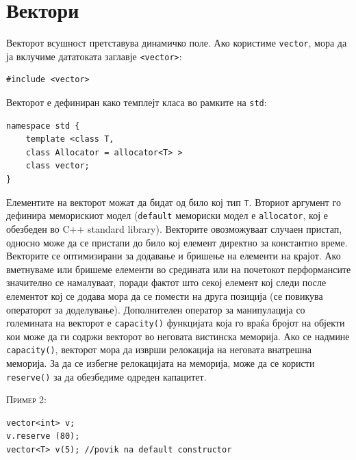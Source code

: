 \section{Вектори}
Векторот всушност претставува динамичко поле. Ако користиме \texttt{vector},
мора да ја вклучиме дататоката заглавје \texttt{<vector>}:
\begin{verbatim}
#include <vector>
\end{verbatim}
Векторот е дефиниран како темплејт класа во рамките на \texttt{std}:

\begin{lstlisting}
namespace std {
	template <class T,
	class Allocator = allocator<T> >
	class vector;
}
\end{lstlisting}

Елементите на векторот можат да бидат од било кој тип \texttt{T}. Вториот
аргумент го дефинира меморискиот модел (\texttt{default} мемориски модел е
\texttt{allocator}, кој е обезбеден во C++ standard library). Векторите
овозможуваат случаен пристап, односно може да се пристапи до било кој елемент
директно за константно време. Векторите се оптимизирани за додавање и бришење на
елементи на крајот. Ако вметнуваме или бришеме елементи во средината или на
почетокот перформансите значително се намалуваат, поради фактот што секој
елемент кој следи после елементот кој се додава мора да се помести на друга
позиција (се повикува операторот за доделување). Дополнителен оператор за
манипулација со големината на векторот е \texttt{capacity()} функцијата која го
враќа бројот на објекти кои може да ги содржи векторот во неговата вистинска
меморија. Ако се надмине \texttt{capacity()}, векторот мора да изврши релокација
на неговата внатрешна меморија. За да се избегне релокацијата на меморија, може
да се користи \texttt{reserve()} за да обезбедиме одреден капацитет. 

\textsc{Пример 2:}
\begin{lstlisting}
vector<int> v;
v.reserve (80);
vector<T> v(5); //povik na default constructor
\end{lstlisting}


